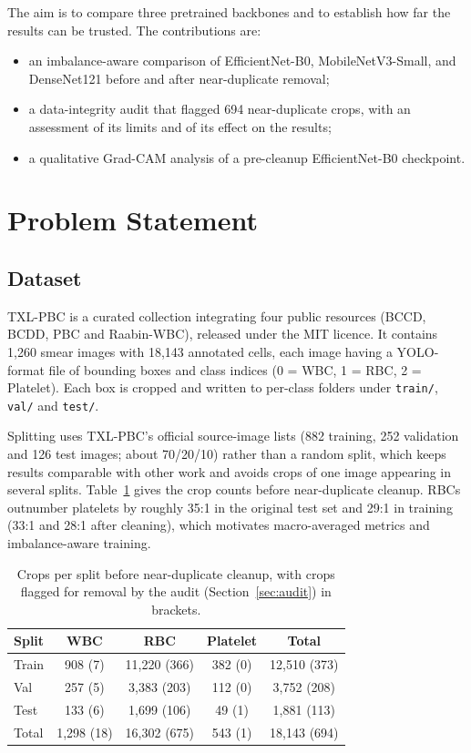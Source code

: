 \documentclass[11pt,a4paper]{article}
\begin{document}
The aim is to compare three pretrained backbones and to establish how far the results can be trusted. The contributions are:
\begin{itemize}[itemsep=2pt]
    \item an imbalance-aware comparison of EfficientNet-B0, MobileNetV3-Small, and DenseNet121 before and after near-duplicate removal;
    \item a data-integrity audit that flagged 694 near-duplicate crops, with an assessment of its limits and of its effect on the results;
    \item a qualitative Grad-CAM analysis of a pre-cleanup EfficientNet-B0 checkpoint.
\end{itemize}

\section{Problem Statement}\label{sec:problem}

\subsection{Dataset}

TXL-PBC \citep{gan2025txlpbc} is a curated collection integrating four public resources (BCCD, BCDD, PBC and Raabin-WBC), released under the MIT licence. It contains 1,260 smear images with 18,143 annotated cells, each image having a YOLO-format file of bounding boxes and class indices (0 = WBC, 1 = RBC, 2 = Platelet). Each box is cropped and written to per-class folders under \texttt{train/}, \texttt{val/} and \texttt{test/}.

Splitting uses TXL-PBC's official source-image lists (882 training, 252 validation and 126 test images; about 70/20/10) rather than a random split, which keeps results comparable with other work and avoids crops of one image appearing in several splits. Table~\ref{tab:dataset} gives the crop counts before near-duplicate cleanup. RBCs outnumber platelets by roughly 35:1 in the original test set and 29:1 in training (33:1 and 28:1 after cleaning), which motivates macro-averaged metrics and imbalance-aware training.

\begin{table}[H]
\centering
\caption[Crops per split before near-duplicate cleanup]{Crops per split before near-duplicate cleanup, with crops flagged for removal by the audit (Section~\ref{sec:audit}) in brackets.}
\label{tab:dataset}
\begin{tabular}{|l|c|c|c|c|}
\hline
\textbf{Split} & \textbf{WBC} & \textbf{RBC} & \textbf{Platelet} & \textbf{Total} \\
\hline
Train & 908 (7) & 11{,}220 (366) & 382 (0) & 12{,}510 (373) \\
\hline
Val & 257 (5) & 3{,}383 (203) & 112 (0) & 3{,}752 (208) \\
\hline
Test & 133 (6) & 1{,}699 (106) & 49 (1) & 1{,}881 (113) \\
\hline
Total & 1{,}298 (18) & 16{,}302 (675) & 543 (1) & 18{,}143 (694) \\
\hline
\end{tabular}
\end{table}
\end{document}
